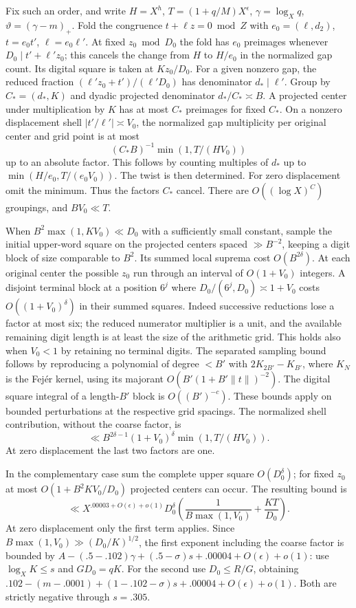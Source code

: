 \documentclass[11pt,a4paper]{article}
\theoremstyle{paperplain}
\numberwithin{equation}{section}
\begin{document}
Fix such an order, and write $H=X^h$, $T=(1+q/M)X^\epsilon$,
$\gamma=\log_Xq$, $\vartheta=(\gamma-m)_+$.
Fold the congruence $t+\ell z=0\bmod Z$ with
$e_0=(\ell,d_2)$, $t=e_0t'$, $\ell=e_0\ell'$.
At fixed $z_0\bmod D_0$ the fold has $e_0$ preimages whenever
$D_0\mid t'+\ell' z_0$; this cancels the change from $H$ to $H/e_0$
in the normalized gap count. Its digital square is taken at
$Kz_0/D_0$. For a given nonzero gap, the reduced fraction
$(\ell'z_0+t')/(\ell'D_0)$ has denominator $d_*\mid\ell'$.
Group by $C_*=(d_*,K)$ and dyadic projected denominator
$d_*/C_*\asymp B$. A projected center under multiplication by $K$
has at most $C_*$ preimages for fixed $C_*$.
On a nonzero displacement shell $|t'/\ell'|\asymp V_0$,
the normalized gap multiplicity per original center and grid point
is at most
\[
 (C_*B)^{-1}\min(1,T/(HV_0))
\]
up to an absolute factor. This follows by counting multiples of
$d_*$ up to $\min(H/e_0,T/(e_0V_0))$. The twist is then determined.
For zero displacement omit the minimum. Thus the factors $C_*$
cancel. There are $O((\log X)^C)$ groupings, and $BV_0\ll T$.

When $B^2\max(1,KV_0)\ll D_0$ with a sufficiently small constant,
sample the initial upper-word square on the projected centers spaced
$\gg B^{-2}$, keeping a digit block of size comparable to $B^2$.
Its summed local suprema cost $O(B^{2\delta})$. At each original
center the possible $z_0$ run through an interval of $O(1+V_0)$
integers. A disjoint terminal block at a position $6^j$ where
$D_0/(6^j,D_0)\asymp1+V_0$ costs $O((1+V_0)^\delta)$ in their
summed squares. Indeed successive reductions lose a factor at most
six; the reduced numerator multiplier is a unit, and the available
remaining digit length is at least the size of the arithmetic grid.
This holds also when $V_0<1$ by retaining no terminal digits.
The separated sampling bound follows by reproducing a polynomial of
degree $<B'$ with $2K_{2B'}-K_{B'}$, where $K_N$ is the Fej\'er
kernel, using its majorant $O(B'(1+B'\|t\|)^{-2})$. The digital
square integral of a length-$B'$ block is $O((B')^{-c})$.
These bounds apply on bounded perturbations at the respective grid
spacings. The normalized shell contribution, without the coarse
factor, is
\[
 \ll B^{2\delta-1}(1+V_0)^\delta\min(1,T/(HV_0)).
\]
At zero displacement the last two factors are one.

In the complementary case sum the complete upper square
$O(D_0^\delta)$; for fixed $z_0$ at most $O(1+B^2KV_0/D_0)$
projected centers can occur. The resulting bound is
\[
 \ll X^{.00003+O(\epsilon)+o(1)}D_0^\delta
 \left(\frac1{B\max(1,V_0)}+\frac{KT}{D_0}\right).
\]
At zero displacement only the first term applies. Since
$B\max(1,V_0)\gg(D_0/K)^{1/2}$, the first exponent including the
coarse factor is bounded by
$A-(.5-.102)\gamma+(.5-\sigma)s+.00004+O(\epsilon)+o(1)$:
use $\log_XK\le s$ and $GD_0=qK$. For the second use
$D_0\le R/G$, obtaining
$.102-(m-.0001)+(1-.102-\sigma)s+.00004+O(\epsilon)+o(1)$.
Both are strictly negative through $s=.305$.
\end{document}

